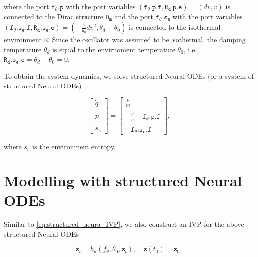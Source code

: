 \documentclass[
	parskip, 			   %
	twoside, 			   %
	DIV=14, 			   %
	BCOR=15.0mm, 		   %
	headsepline, 		   %
	open=right, 		   %
	captions=tableheading, %
	bibliography=totoc,    %
	numbers=noenddot       %
]{scrreprt}
\begin{document}
where the port $\mathtt{f_{\theta}.p}$ with the port variables $(\mathtt{f_{\theta}.p.f}, \mathtt{R_{d}.p.e}) = (dv, v)$ is connected to the Dirac structure $\mathtt{D_m}$ and the port $\mathtt{f_{\theta}.s_{e}}$ with the port variables $(\mathtt{f_{\theta}.s_{e}.f}, \mathtt{R_{d}.s_{e}.e}) = (-\frac{1}{\theta_{0}}dv^2, \theta_{d}-\theta_{0})$ is connected to the isothermal environment $\mathtt{E}$. Since the oscillator was assumed to be isothermal, the damping temperature $\theta_{d}$ is equal to the envirnoment temperature $\theta_{0}$, i.e., $\mathtt{R_{d}.s_{e}.e} = \theta_{d}-\theta_{0} = 0$.

To obtain the system dynamics, we solve structured Neural ODEs (or a system of structured Neural ODEs)

\begin{equation}
    \label{eq:NeuralODE_idho_EPHS}
    \begin{bmatrix}
    \dot{q}\\\\
    \dot{p}\\\\
    \dot{s_e}
    \end{bmatrix}
    =
    \begin{bmatrix}
    \frac{p}{m}\\\\
    -\frac{q}{c}-\mathtt{f_{\theta}.p.f}\\\\
    -\mathtt{f_{\theta}.s_{e}.f}
    \end{bmatrix},
\end{equation}

where $s_e$ is the environment entropy.


\section{Modelling with structured Neural ODEs}

Similar to \ref{eq:structured_neura_IVP}, we also construct an IVP for the above structured Neural ODEs

\begin{equation}
    \label{eq:structured_neural_EPHS_IVP}
    \dot{\mathbf{z}}_t = h_{\theta}(f_{\theta}, \theta_0, \mathbf{z}_t), \quad \mathbf{z}(t_{0}) = \mathbf{z}_{0},
\end{equation}
\end{document}
